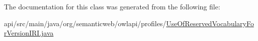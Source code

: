 The documentation for this class was generated from the following file\-:\begin{DoxyCompactItemize}
\item 
api/src/main/java/org/semanticweb/owlapi/profiles/\hyperlink{_use_of_reserved_vocabulary_for_version_i_r_i_8java}{Use\-Of\-Reserved\-Vocabulary\-For\-Version\-I\-R\-I.\-java}\end{DoxyCompactItemize}

